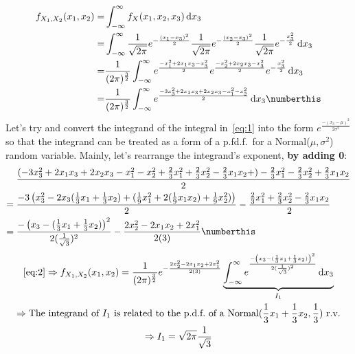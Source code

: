 \documentclass{mthe353answer}
\begin{document}
\begin{questions}
  \setcounter{question}{1}
  \question{}
  \begin{align*}
    f_{X_1,X_2}(x_1,x_2) =& \int_{-\infty}^{\infty} f_X(x_1,x_2,x_3) \,\mathrm{d}x_3\\
    =& \int_{-\infty}^{\infty} \frac{1}{\sqrt{2\pi}} e^{-\frac{(x_1-x_3)^2}{2}} \frac{1}{\sqrt{2\pi}} e^{-\frac{(x_2-x_3)^2}{2}} \frac{1}{\sqrt{2\pi}} e^{-\frac{x_3^2}{2}} \,\mathrm{d}x_3\\
    =& \frac{1}{(2\pi)^\frac{3}{2}} \int_{-\infty}^{\infty} e^{\frac{-x_1^2+2x_1x_3-x_3^2}{2}} e^{\frac{-x_2^2+2x_2x_3-x_3^2}{2}} e^{-\frac{x_3^2}{2}} \,\mathrm{d}x_3\\
    =& \frac{1}{(2\pi)^\frac{3}{2}} \int_{-\infty}^{\infty} e^{\frac{-3x_3^2+2x_1x_3+2x_2x_3-x_1^2-x_2^2}{2}} \,\mathrm{d}x_3 \numberthis \label{eq:1}
  \end{align*}
  Let's try and convert the integrand of the integral in~\eqref{eq:1} into the 
  form \(e^\frac{-(x_3-\mu)^2}{2\sigma^2}\) so that the integrand can be treated 
  as a form of a p.fd.f.\ for a Normal(\(\mu,\sigma^2\)) 
  random variable. Mainly, let's rearrange the integrand's exponent, \textbf{by adding 0}:
  \begin{align*}
     &\; \frac{(-3x_3^2+2x_1x_3+2x_2x_3-x_1^2-x_2^2+\frac{2}{3}x_1^2+\frac{2}{3}x_2^2-\frac{2}{3}x_1x_2+)-\frac{2}{3}x_1^2-\frac{2}{3}x_2^2+\frac{2}{3}x_1x_2}{2}\\
    =&\; \frac{-3\left(x_3^2 - 2x_3(\frac{1}{3}x_1+\frac{1}{3}x_2) + (\frac{1}{9}x_1^2 + 2(\frac{1}{9}x_1x_2) + \frac{1}{9}x_2^2)\right)}{2} - \frac{\frac{2}{3}x_1^2 + \frac{2}{3}x_2^2 - \frac{2}{3}x_1x_2}{2}\\
    =&\; \frac{-\left(x_3-(\frac{1}{3}x_1+\frac{1}{3}x_2)\right)^2}{2(\frac{1}{\sqrt{3}})^2} - \frac{2x_2^2-2x_1x_2+2x_1^2}{2(3)} \numberthis \label{eq:2}
  \end{align*}
  \begin{gather*}
    \text{\eqref{eq:2}} \Rightarrow f_{X_1,X_2}(x_1,x_2) = \frac{1}{(2\pi)^\frac{3}{2}} e^{-\frac{2x_2^2-2x_1x_2+2x_1^2}{2(3)}} 
      \underbrace{\int_{-\infty}^{\infty} e^{\frac{-\left(x_3-(\frac{1}{3}x_1+\frac{1}{3}x_2)\right)^2}{2(\frac{1}{\sqrt{3}})^2}} \,\mathrm{d}x_3}_{I_1}\\
    \Rightarrow \text{The integrand of \(I_1\) is related to the p.d.f.\ of a Normal(\(\frac{1}{3}x_1+\frac{1}{3}x_2, \frac{1}{3}\)) r.v.}\\
    \Rightarrow I_1 = \sqrt{2\pi}\frac{1}{\sqrt{3}}\\

\end{gather*}
\end{questions}
\end{document}
